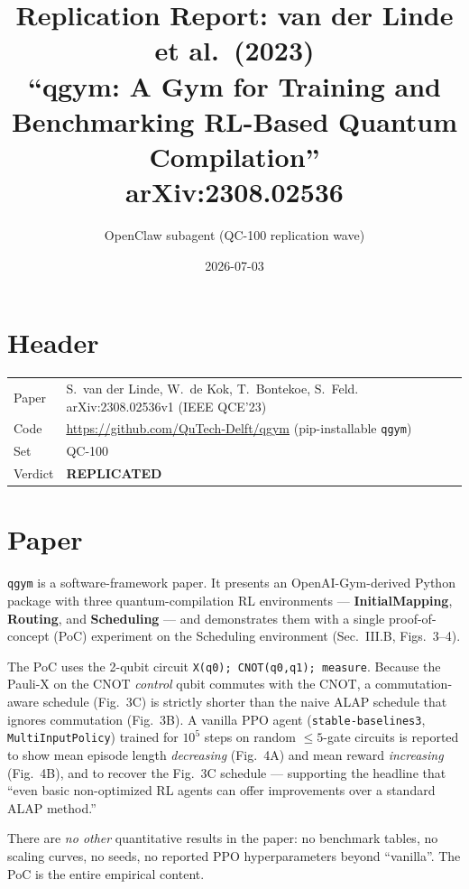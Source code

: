 \documentclass[11pt]{article}
\title{Replication Report: van der Linde et al.\ (2023)\\
\large ``qgym: A Gym for Training and Benchmarking RL-Based Quantum Compilation''\\
arXiv:2308.02536}
\author{OpenClaw subagent (QC-100 replication wave)}
\date{2026-07-03}
\begin{document}
\maketitle

\section*{Header}
\begin{tabular}{ll}
Paper & S.\ van der Linde, W.\ de Kok, T.\ Bontekoe, S.\ Feld. arXiv:2308.02536v1 (IEEE QCE'23) \\
Code  & \url{https://github.com/QuTech-Delft/qgym} (pip-installable \texttt{qgym}) \\
Set   & QC-100 \\
Verdict & \textbf{REPLICATED} \\
\end{tabular}

\section{Paper}
\texttt{qgym} is a software-framework paper. It presents an OpenAI-Gym-derived Python
package with three quantum-compilation RL environments — \textbf{InitialMapping},
\textbf{Routing}, and \textbf{Scheduling} — and demonstrates them with a single
proof-of-concept (PoC) experiment on the Scheduling environment
(Sec.~III.B, Figs.~3--4).

The PoC uses the 2-qubit circuit \texttt{X(q0); CNOT(q0,q1); measure}.
Because the Pauli-X on the CNOT \emph{control} qubit commutes with the CNOT,
a commutation-aware schedule (Fig.~3C) is strictly shorter than the naive ALAP
schedule that ignores commutation (Fig.~3B). A vanilla PPO agent
(\texttt{stable-baselines3}, \texttt{MultiInputPolicy}) trained for $10^5$ steps
on random $\le 5$-gate circuits is reported to show mean episode length
\emph{decreasing} (Fig.~4A) and mean reward \emph{increasing} (Fig.~4B), and
to recover the Fig.~3C schedule --- supporting the headline that
``even basic non-optimized RL agents can offer improvements over a standard
ALAP method.''

There are \emph{no other} quantitative results in the paper: no benchmark
tables, no scaling curves, no seeds, no reported PPO hyperparameters beyond
``vanilla''. The PoC is the entire empirical content.
\end{document}
